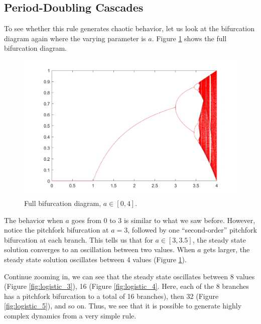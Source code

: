 \documentclass[twocolumn,amsmath,amssymb,aps]{revtex4}
\begin{document}
\subsection{Period-Doubling Cascades}
To see whether this rule generates chaotic behavior, let us look at the bifurcation diagram again where the varying parameter is $a$. Figure \ref{fig:logistic_2} shows the full bifurcation diagram. 
\begin{figure}[!htb]
	\centering
	\includegraphics[scale=0.25]{logistic_2.png}
	\caption{Full bifurcation diagram, $a \in [0,4]$.}
	\label{fig:logistic_2}
\end{figure}


The behavior when $a$ goes from $0$ to $3$ is similar to what we saw before. However, notice the pitchfork bifurcation at $a= 3$, followed by one ``second-order'' pitchfork bifurcation at each branch. This tells us that for $a \in [3,3.5]$, the steady state solution converges to an oscillation between two values. When $a$ gets larger, the steady state solution oscillates between 4 values (Figure \ref{fig:logistic_2}).

Continue zooming in, we can see that the steady state oscillates between 8 values (Figure \ref{fig:logistic_3}), 16 (Figure \ref{fig:logistic_4}. Here, each of the 8 branches has a pitchfork bifurcation to a total of 16 branches), then 32 (Figure \ref{fig:logistic_5}), and so on. Thus, we see that it is possible to generate highly complex dynamics from a very simple rule.
\end{document}
